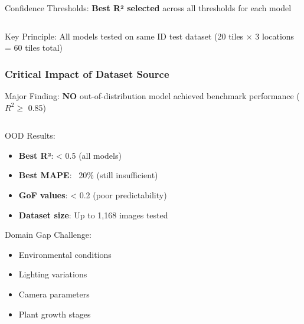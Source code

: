 \documentclass[aspectratio=43]{beamer}
\begin{document}
\begin{frame}
\begin{columns}
\begin{column}{0.4\textwidth}
\begin{exampleblock}{Confidence Thresholds:}
                \vspace{0.3cm}
                \textbf{Best R² selected} across all thresholds for each model
            \end{exampleblock}
        \end{column}
    \end{columns}
    
    \begin{alertblock}{Key Principle:}
        \small All models tested on same ID test dataset (20 tiles × 3 locations = 60 tiles total)
    \end{alertblock}
\end{frame}

\begin{frame}
    \frametitle{Critical Impact of Dataset Source}
    
    \begin{alertblock}{Major Finding:}
        \large \textbf{NO} out-of-distribution model achieved benchmark performance ($R^2 \geq$ 0.85)
    \end{alertblock}
    
    \begin{columns}
        \begin{column}{0.5\textwidth}
            \begin{block}{OOD Results:}
                \small
                \begin{itemize}
                    \item \textbf{Best R²}: < 0.5 (all models)
                    \item \textbf{Best MAPE}: ~20\% (still insufficient)
                    \item \textbf{GoF values}: < 0.2 (poor predictability)
                    \item \textbf{Dataset size}: Up to 1,168 images tested
                \end{itemize}
            \end{block}
            
            \begin{alertblock}{Domain Gap Challenge:}
                \small
                \begin{itemize}
                    \item Environmental conditions
                    \item Lighting variations
                    \item Camera parameters
                    \item Plant growth stages
                \end{itemize}
            \end{alertblock}
        \end{column}
        

\end{columns}
\end{frame}
\end{document}
